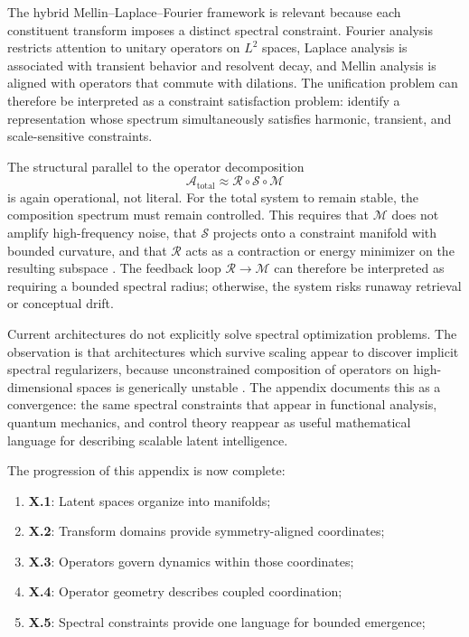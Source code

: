 The hybrid Mellin--Laplace--Fourier framework \cite{irwin2026mlf} is relevant because each constituent transform imposes a distinct spectral constraint. Fourier analysis restricts attention to unitary operators on $L^2$ spaces, Laplace analysis is associated with transient behavior and resolvent decay, and Mellin analysis is aligned with operators that commute with dilations. The unification problem can therefore be interpreted as a constraint satisfaction problem: identify a representation whose spectrum simultaneously satisfies harmonic, transient, and scale-sensitive constraints.

The structural parallel to the operator decomposition
\[
\mathcal{A}_{\mathrm{total}} \approx \mathcal{R} \circ \mathcal{S} \circ \mathcal{M}
\]
is again operational, not literal. For the total system to remain stable, the composition spectrum must remain controlled. This requires that $\mathcal{M}$ does not amplify high-frequency noise, that $\mathcal{S}$ projects onto a constraint manifold with bounded curvature, and that $\mathcal{R}$ acts as a contraction or energy minimizer on the resulting subspace \cite{scellier2017equilibrium}. The feedback loop $\mathcal{R}\rightarrow\mathcal{M}$ can therefore be interpreted as requiring a bounded spectral radius; otherwise, the system risks runaway retrieval or conceptual drift.

Current architectures do not explicitly solve spectral optimization problems. The observation is that architectures which survive scaling appear to discover implicit spectral regularizers, because unconstrained composition of operators on high-dimensional spaces is generically unstable \cite{pennington2017nonlinear}. The appendix documents this as a convergence: the same spectral constraints that appear in functional analysis, quantum mechanics, and control theory reappear as useful mathematical language for describing scalable latent intelligence.

The progression of this appendix is now complete:

\begin{enumerate}
\item \textbf{X.1}: Latent spaces organize into manifolds;
\item \textbf{X.2}: Transform domains provide symmetry-aligned coordinates;
\item \textbf{X.3}: Operators govern dynamics within those coordinates;
\item \textbf{X.4}: Operator geometry describes coupled coordination;
\item \textbf{X.5}: Spectral constraints provide one language for bounded emergence;
\end{enumerate}

